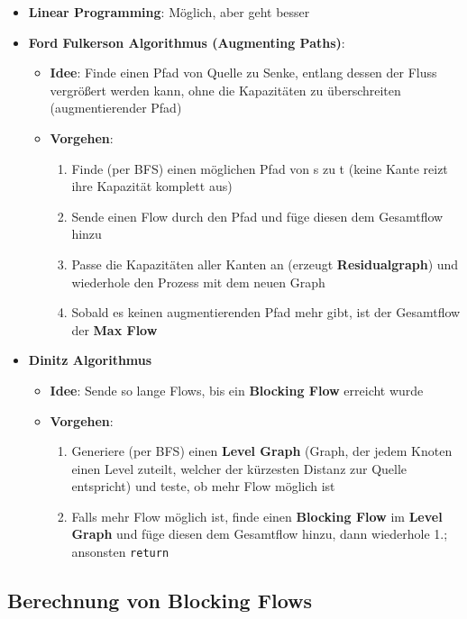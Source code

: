\documentclass[10pt,a4paper]{article}
\begin{document}
	\begin{itemize}
		\item \textbf{Linear Programming}: Möglich, aber geht besser
		\item \textbf{Ford Fulkerson Algorithmus (Augmenting Paths)}:
		\begin{itemize}
			\item \textbf{Idee}: Finde einen Pfad von Quelle zu Senke, entlang dessen der Fluss vergrößert werden kann, ohne die Kapazitäten zu überschreiten (augmentierender Pfad)
			\item \textbf{Vorgehen}:
			\begin{enumerate}
				\item Finde (per BFS) einen möglichen Pfad von s zu t (keine Kante reizt ihre Kapazität komplett aus)
				\item Sende einen Flow durch den Pfad und füge diesen dem Gesamtflow hinzu
				\item Passe die Kapazitäten aller Kanten an (erzeugt \textbf{Residualgraph}) und wiederhole den Prozess mit dem neuen Graph
				\item Sobald es keinen augmentierenden Pfad mehr gibt, ist der Gesamtflow der \textbf{Max Flow}
			\end{enumerate}
		\end{itemize}
		\newpage
		\item \textbf{Dinitz Algorithmus}
		\begin{itemize}
			\item \textbf{Idee}: Sende so lange Flows, bis ein \textbf{Blocking Flow} erreicht wurde
			\item \textbf{Vorgehen}:
			\begin{enumerate}
				\item Generiere (per BFS) einen \textbf{Level Graph} (Graph, der jedem Knoten einen Level zuteilt, welcher der kürzesten Distanz zur Quelle entspricht) und teste, ob mehr Flow möglich ist
				\item Falls mehr Flow möglich ist, finde einen \textbf{Blocking Flow} im \textbf{Level Graph} und füge diesen dem Gesamtflow hinzu, dann wiederhole 1.; ansonsten \texttt{return}
			\end{enumerate}
		\end{itemize}
	\end{itemize}

	\subsection{Berechnung von Blocking Flows}
	\label{mfm:sub:berechnung_von_blocking_flows}
	
\end{document}
